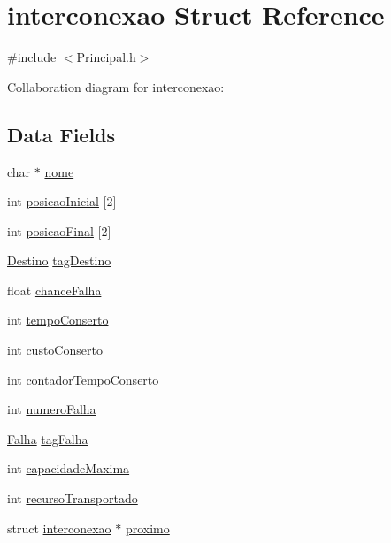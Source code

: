 \hypertarget{structinterconexao}{\section{interconexao Struct Reference}
\label{structinterconexao}
}


{\ttfamily \#include $<$Principal.\-h$>$}



Collaboration diagram for interconexao\-:
\subsection*{Data Fields}
\begin{DoxyCompactItemize}
\item 
char $\ast$ \hyperlink{structinterconexao_ae2a0f66178bb1c4d42e2b70ec9426ccb}{nome}
\item 
int \hyperlink{structinterconexao_a2584a890a5daa3979c8f5def66b37a93}{posicao\-Inicial} \mbox{[}2\mbox{]}
\item 
int \hyperlink{structinterconexao_a744a0aae2f2c8216f4e62181f4eef596}{posicao\-Final} \mbox{[}2\mbox{]}
\item 
\hyperlink{_principal_8h_a25b25bd9b7208df5558e2c89bb31469f}{Destino} \hyperlink{structinterconexao_a14094f7ac62c8b911b9218533444f891}{tag\-Destino}
\item 
float \hyperlink{structinterconexao_aa8ab52bccf94e202dc5c2b5c6a1c031b}{chance\-Falha}
\item 
int \hyperlink{structinterconexao_aadac5447051c1979a90f047e50e1119f}{tempo\-Conserto}
\item 
int \hyperlink{structinterconexao_aa3f746c0d39f7be1ecded1e29cf8dc9a}{custo\-Conserto}
\item 
int \hyperlink{structinterconexao_ad528963bec160684795fa243ed6d8036}{contador\-Tempo\-Conserto}
\item 
int \hyperlink{structinterconexao_a131582956c0866fc51a6855fef6a3cb5}{numero\-Falha}
\item 
\hyperlink{_principal_8h_ab80478651cd53bf69168abd99c5b2afb}{Falha} \hyperlink{structinterconexao_ab6bff15141ec55edeb4370cdee3fe3d8}{tag\-Falha}
\item 
int \hyperlink{structinterconexao_abe24567e8cdbfefa8ffa9d6911078a7a}{capacidade\-Maxima}
\item 
int \hyperlink{structinterconexao_aa7760e925040fa4b54d3a847e27c0f82}{recurso\-Transportado}
\item 
struct \hyperlink{structinterconexao}{interconexao} $\ast$ \hyperlink{structinterconexao_a1cf2ab988ac89d1e06938f7149fb2b39}{proximo}

\end{DoxyCompactItemize}
